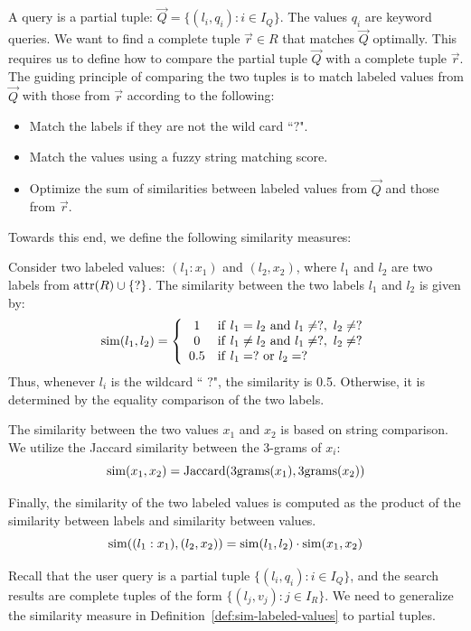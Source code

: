 A query is a partial tuple: $\vec Q = \{(l_i, q_i): i\in I_Q\}$.  The values $q_i$ are keyword queries.
We want to find a complete tuple $\vec r \in R$ that matches $\vec Q$ optimally.  This requires us to define how to compare the partial tuple $\vec Q$ with a complete tuple $\vec r$.  The guiding principle of comparing the two tuples is to match labeled values from $\vec Q$ with those from $\vec r$ according to the following:
\begin{itemize}
    \item Match the labels if they are not the wild card ``$?$".
    \item Match the values using a fuzzy string matching score.
    \item Optimize the sum of similarities between labeled values from $\vec Q$ and those from $\vec r$.
\end{itemize}
Towards this end, we define the following similarity measures:

\begin{definition}
\label{def:sim-labeled-values}

Consider two labeled values: $(l_1: x_1)$ and $(l_2, x_2)$,
where $l_1$ and $l_2$ are two labels from $\operatorname{attr}(R)\cup\{?\}$.  The similarity between the two labels $l_1$ and $l_2$ is given by:
    $$
    \Sim(l_1, l_2) = \left\{
    \begin{array}{cl}
    1 & \mathrm{if}\ l_1 = l_2\ \mathrm{and}\ l_1\not=?,\ l_2\not=? \\
    0 & \mathrm{if}\ l_1 \not= l_2 \ \mathrm{and}\ l_1\not=?,\ l_2\not=? \\
    0.5 & \mathrm{if}\ l_1 = ?\ \mathrm{or}\ l_2 = ?
    \end{array}
    \right.
    $$
    Thus, whenever $l_i$ is the wildcard `` $?$", the similarity is 0.5. Otherwise, it is determined by the equality comparison of the two labels.

The similarity between the two values $x_1$ and $x_2$ is based on string comparison.  We utilize
the Jaccard similarity between the 3-grams of $x_i$:
$$
\mathrm{sim}(x_1, x_2) = \mathrm{Jaccard}(\mathrm{3grams}(x_1), \mathrm{3grams}(x_2))
$$

Finally, the similarity of the two labeled values is computed as the product of the
similarity between labels and similarity between values.
$$
\mathrm{sim}((l_1:x_1), (l_2,x_2)) = \mathrm{sim}(l_1, l_2)\cdot\mathrm{sim}(x_1, x_2)
$$
\end{definition}

Recall that the user query is a partial tuple $\{(l_i, q_i): i\in I_Q\}$,
and the search results are complete tuples of the form
$\{(l_j, v_j): j\in I_R\}$.  We need to generalize the similarity measure in Definition~\ref{def:sim-labeled-values} to partial tuples.

